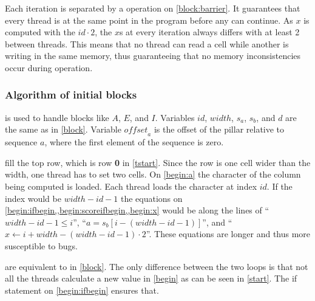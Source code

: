 Each iteration is separated by a  operation on \cref{block:barrier}.
It guarantees that every thread is at the same point in the program before any can continue.
As $x$ is computed with the $id \cdot 2$, the $x$s at every iteration always differs with at least 2 between threads.
This means that no thread can read a cell while another is writing in the same memory, thus guaranteeing that no memory inconsistencies occur during operation.



\subsubsection{Algorithm of initial blocks}
 is used to handle blocks like $A$, $E$, and $I$.
Variables $id$, $width$, $s_a$, $s_b$, and $d$ are the same as in \cref{block}.
Variable $\mathit{offset}_a$ is the offset of the pillar relative to sequence $a$, where the first element of the sequence is zero.

 fill the top row, which is row \textbf{0} in \cref{tstart}.
Since the row is one cell wider than the width, one thread has to set two cells.
On \cref{begin:a} the character of the column being computed is loaded.
Each thread loads the character at index $id$.
If the index would be $width - id - 1$ the equations on \cref{begin:ifbegin,,begin:scoreifbegin,,begin:x} would be along the lines of ``$width - id - 1 \leq i$'', ``$a = s_b[i-(width-id-1)]$'', and ``$x \gets i + width - (width - id - 1) \cdot 2$''.
These equations are longer and thus more susceptible to bugs.

 are equivalent to  in \cref{block}.
The only difference between the two loops is that not all the threads calculate a new value in \cref{begin} as can be seen in \cref{start}.
The if statement on \cref{begin:ifbegin} ensures that.



